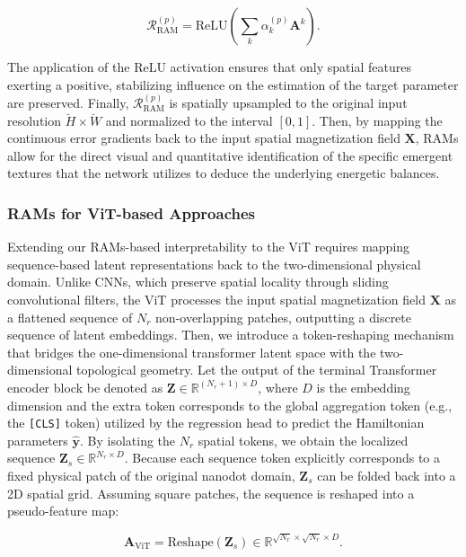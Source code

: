 \documentclass[final,5p,times,twocolumn]{elsarticle}
\begin{document}
\begin{equation}\label{eq:RAM_Formulation}
\mathbf{\mathcal{R}}_{\text{RAM}}^{(p)} = \text{ReLU} \left( \sum_k \alpha_k^{(p)} \mathbf{A}^k \right).
\end{equation}

The application of the ReLU activation ensures that only spatial features exerting a positive, stabilizing influence on the estimation of the target parameter are preserved. Finally, $\mathcal{R}_{\text{RAM}}^{(p)}$ is spatially upsampled to the original input resolution $\breve{H} \times \breve{W}$ and normalized to the interval $[0,1]$. Then, by mapping the continuous error gradients back to the input spatial magnetization field $\mathbf{X}$, RAMs allow for the direct visual and quantitative identification of the specific emergent textures that the network utilizes to deduce the underlying energetic balances. 


\subsubsection{RAMs for ViT-based Approaches}\label{sec:ViT_RAMs}
Extending our RAMs-based interpretability to the ViT requires mapping sequence-based latent representations back to the two-dimensional physical domain. Unlike CNNs, which preserve spatial locality through sliding convolutional filters, the ViT processes the input spatial magnetization field $\mathbf{X}$ as a flattened sequence of $N_r$ non-overlapping patches, outputting a discrete sequence of latent embeddings. Then, we introduce a token-reshaping mechanism that bridges the one-dimensional transformer latent space with the two-dimensional topological geometry. Let the output of the terminal Transformer encoder block be denoted as $\mathbf{Z} \in \mathbb{R}^{(N_r + 1) \times D}$, where $D$ is the embedding dimension and the extra token corresponds to the global aggregation token (e.g., the \texttt{[CLS]} token) utilized by the regression head to predict the Hamiltonian parameters $\hat{\mathbf{y}}$. By isolating the $N_r$ spatial tokens, we obtain the localized sequence $\mathbf{Z}_s \in \mathbb{R}^{N_r \times D}$. Because each sequence token explicitly corresponds to a fixed physical patch of the original nanodot domain, $\mathbf{Z}_s$ can be folded back into a 2D spatial grid. Assuming square patches, the sequence is reshaped into a pseudo-feature map:

\begin{equation}\label{eq:ViT_Reshape}
\mathbf{A}_{\text{ViT}} = \text{Reshape}(\mathbf{Z}_s) \in \mathbb{R}^{\sqrt{N_r} \times \sqrt{N_r} \times D}.
\end{equation}
\end{document}
